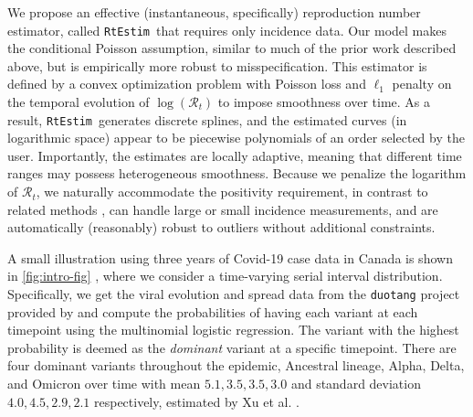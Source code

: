 \documentclass[10pt,letterpaper]{article}
\def\RtEstim{\texttt{RtEstim}}
\def\calR{\mathcal{R}}
\newcommand{\citep}[1]{\cite{#1}}
\begin{document}
We propose an effective (instantaneous, specifically) reproduction number estimator, 
called \RtEstim\ that requires only incidence data. Our model makes the
conditional Poisson assumption, similar to much of the prior work described
above, but is empirically more robust to misspecification. This estimator is 
defined by a convex optimization problem with Poisson loss and $\ell_1$ penalty 
on the temporal evolution of $\log(\calR_t)$ to impose smoothness over time. 
As a result, \RtEstim\ generates discrete splines, and the estimated curves (in
logarithmic space) appear to be piecewise polynomials of an order selected by the
user. Importantly, the estimates are locally adaptive, meaning that different
time ranges may possess heterogeneous smoothness. Because we penalize the
logarithm of $\calR_t$, we naturally accommodate the positivity requirement, in
contrast to related methods \citep{abry2020spatial,pascal2022nonsmooth}, can
handle large or small incidence measurements, and are automatically (reasonably)
robust to outliers without additional constraints. 

A small illustration using three years of Covid-19 case data in Canada is shown in 
\autoref{fig:intro-fig} \citep{CovidTimelineCanada}, where we consider a time-varying
serial interval distribution. Specifically, we get the viral evolution and spread data 
from the \texttt{duotang} project provided by \cite{duotang_2023} and compute the 
probabilities of having each variant at each timepoint using the multinomial logistic 
regression. The variant with the highest probability is deemed as the \textit{dominant} variant
at a specific timepoint. There are four dominant variants throughout the epidemic, 
Ancestral lineage, Alpha, Delta, and Omicron over time with mean $5.1,3.5,3.5,3.0$ and 
standard deviation $4.0,4.5,2.9,2.1$ respectively, estimated by Xu et al. \citep{xu2023assessing}. 
\end{document}
